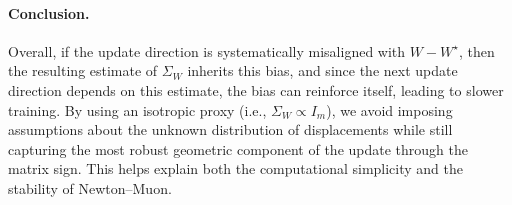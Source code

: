 \documentclass[11pt]{article}
\begin{document}
\paragraph{Conclusion.}
Overall, if the update direction is systematically misaligned with ${W}-W^\star$, then the resulting estimate of ${\Sigma}_{{W}}$ inherits this bias, and since the next update direction depends on this estimate, the bias can reinforce itself, leading to slower training.
By using an isotropic proxy (i.e., ${\Sigma}_{{W}}\propto {I}_m$), we avoid imposing assumptions about the unknown distribution of displacements while still capturing the most robust geometric component of the update through the matrix sign. This helps explain both the computational simplicity and the stability of Newton--Muon.
\end{document}
